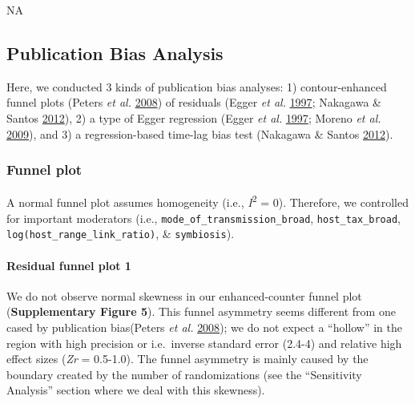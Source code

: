 \documentclass[
]{article}
\begin{document}
NA

\hypertarget{publication-bias-analysis}{%
\subsection{Publication Bias Analysis}\label{publication-bias-analysis}}

Here, we conducted 3 kinds of publication bias analyses: 1)
contour-enhanced funnel plots (Peters \emph{et al.}
\protect\hyperlink{ref-peters2008contour}{2008}) of residuals (Egger
\emph{et al.} \protect\hyperlink{ref-egger1997bias}{1997}; Nakagawa \&
Santos \protect\hyperlink{ref-nakagawa2012methodological}{2012}), 2) a
type of Egger regression (Egger \emph{et al.}
\protect\hyperlink{ref-egger1997bias}{1997}; Moreno \emph{et al.}
\protect\hyperlink{ref-moreno2009assessment}{2009}), and 3) a
regression-based time-lag bias test (Nakagawa \& Santos
\protect\hyperlink{ref-nakagawa2012methodological}{2012}).

\hypertarget{funnel-plot}{%
\subsubsection{Funnel plot}\label{funnel-plot}}

A normal funnel plot assumes homogeneity (i.e.,
\emph{I}\textsuperscript{2} = 0). Therefore, we controlled for important
moderators (i.e., \texttt{mode\_of\_transmission\_broad},
\texttt{host\_tax\_broad}, \texttt{log(host\_range\_link\_ratio)}, \&
\texttt{symbiosis}).

\hypertarget{residual-funnel-plot-1}{%
\paragraph{Residual funnel plot 1}\label{residual-funnel-plot-1}}

We do not observe normal skewness in our enhanced-counter funnel plot
(\textbf{Supplementary Figure 5}). This funnel asymmetry seems different
from one cased by publication bias(Peters \emph{et al.}
\protect\hyperlink{ref-peters2008contour}{2008}); we do not expect a
``hollow'' in the region with high precision or i.e.~inverse standard
error (2.4-4) and relative high effect sizes (\emph{Zr} = 0.5-1.0). The
funnel asymmetry is mainly caused by the boundary created by the number
of randomizations (see the ``Sensitivity Analysis'' section where we
deal with this skewness).
\end{document}
